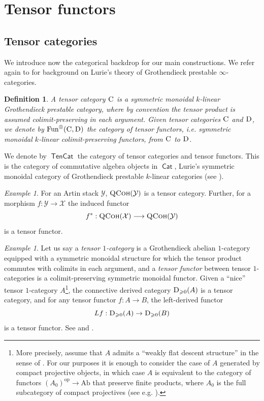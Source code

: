 \documentclass[12pt, oneside]{amsart}
\numberwithin{equation}{section}
\newtheorem{definition}[subsubsection]{Definition}
\theoremstyle{remark}
\newtheorem{example}[subsubsection]{Example}
\theoremstyle{plain}
\renewcommand{\geq}{\geqslant}
\newcommand{\Cat}{\operatorname{\mathsf{Cat}}}
\newcommand{\TenCat}{\operatorname{\mathsf{TenCat}}}
\newcommand{\CCC}{\TenCat}
\newcommand{\CC}{\textsc{C}}
\newcommand{\DD}{\textsc{D}}
\DeclareMathOperator{\QCoh}{\textsc{QCoh}}
\newcommand{\TensFun}{\operatorname{Fun}^{\otimes}}
\newcommand{\YY}{\mathcal{Y}}
\newcommand{\XX}{\mathcal{X}}
\begin{document}
\section{Tensor functors}\label{sec:tensor}

\subsection{Tensor categories} \label{ssec:tensorcat}
We introduce now the categorical backdrop for our main constructions. We refer again to \cite[\S C.1.4]{SAG} for background on Lurie's theory of Grothendieck prestable $\infty$-categories.

\begin{definition} A \emph{tensor category} $\CC$ is a symmetric monoidal $k$-linear Grothendieck prestable category, where by convention the tensor product is assumed colimit-preserving in each argument. Given tensor categories $\CC$ and $\DD$, we denote by $\TensFun(\CC, \DD)$ the category of \emph{tensor functors}, i.e. symmetric monoidal $k$-linear colimit-preserving functors, from $\CC$ to $\DD$. \end{definition}

We denote by $\CCC$ the category of tensor categories and tensor functors. This is the category of commutative algebra objects in $\Cat$, Lurie's symmetric monoidal category of Grothendieck prestable $k$-linear categories (see \cite[\S C.4.2]{SAG}).

\begin{example} For an Artin stack $\YY$, $\QCoh(\YY)$ is a tensor category. Further, for a morphism $f:\YY\rightarrow\XX$ the induced functor $$f^{*}:\QCoh(\XX)\longrightarrow\QCoh(\YY)$$ is a tensor functor. \end{example}

\begin{example} Let us say a \emph{tensor $1$-category} is a Grothendieck abelian $1$-category equipped with a symmetric monoidal structure for which the tensor product commutes with colimits in each argument, and a \emph{tensor functor} between tensor $1$-categories is a colimit-preserving symmetric monoidal functor. Given a ``nice'' tensor $1$-category $A$\footnote{%
  More precisely, assume that $A$ admits a ``weakly flat descent structure'' in the sense of \cite[2.2, 3.1]{CisDeg}.
  For our purposes it is enough to consider the case of $A$ generated by compact projective objects, in which case $A$ is equivalent to the category of functors $(A_0)^{\mathrm{op}} \to \mathrm{Ab}$ that preserve finite products, where $A_0$ is the full subcategory of compact projectives (see e.g. \cite[\S 5.1]{CesScholze}).
}, the connective derived category $\DD_{\geq 0}(A)$ is a tensor category, and for any tensor functor $f : A \to B$, the left-derived functor $$Lf : \DD_{\geq 0}(A) \to \DD_{\geq 0}(B)$$ is a tensor functor. See \cite[Thm.~2.14, Prop.~3.2]{CisDeg} and \cite[Prop.~1.3.5.15, Cor.~1.3.4.26, Ex.~4.1.7.6]{LurieHA}. \end{example}
\end{document}
